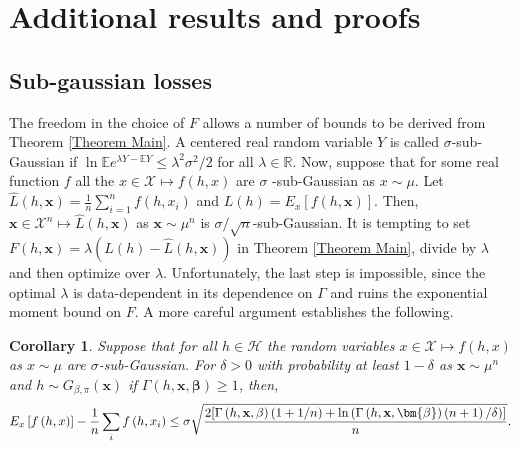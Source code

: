 \documentclass{article} %
\newtheorem{corollary}[theorem]{Corollary}
\begin{document}
\section{Additional results and proofs}

\subsection{Sub-gaussian losses\label{Section Subgaussian}}

The freedom in the choice of $F$ allows a number of bounds to be derived
from Theorem \ref{Theorem Main}. A centered real random variable $Y$ is called $\sigma $-sub-Gaussian
if $\ln \mathbb{E}e^{\lambda Y-\mathbb{E}Y}\leq \lambda ^{2}\sigma ^{2}/2$
for all $\lambda \in \mathbb{R}$. Now, suppose that for some real function $f$
all the $x\in \mathcal{X\mapsto }f\left( h,x\right) $ are $\sigma $%
-sub-Gaussian as $x\sim \mu $. Let  $\hat{L}(h, \mathbf{x}) = \frac{1}{n}\sum_{i=1}^{n} f(h, x_i)$ and $L(h) = E_x[f(h, \mathbf{x})]$. Then, $\mathbf{x}\in \mathcal{X}^{n}\mapsto 
\hat{L}\left( h,\mathbf{x}\right) $ as $\mathbf{x}\sim \mu ^{n}$ is $\sigma /%
\sqrt{n}$-sub-Gaussian. It is tempting to set $F\left( h,\mathbf{x}\right)
=\lambda \left( L\left( h\right) -\hat{L}\left( h,\mathbf{x}\right) \right) $
in Theorem \ref{Theorem Main}, divide by $\lambda $ and then optimize over $%
\lambda $. Unfortunately, the last step is impossible, since the optimal $%
\lambda $ is data-dependent in its dependence on $\Gamma $ and ruins the
exponential moment bound on $F$. A more careful argument establishes the
following.

\begin{corollary}
	\label{Corollary Stratify}Suppose that for all $h\in \mathcal{H}$ the random
	variables $x\in \mathcal{X\mapsto} f \left( h,x\right) $ as $x\sim \mu $
	are $\sigma $-sub-Gaussian. For $\delta >0$ with probability at least $%
	1-\delta $ as $\mathbf{x}\sim \mu ^{n}$ and $h\sim G_{\beta ,\pi }\left( 
	\mathbf{x}\right) $ if $\Gamma \left( h,\mathbf{x},\bm{\beta}\right)
	\geq 1$, then,%
	\begin{equation*}
		E_{x}\left[ f\left( h,x\right) \right] -\frac{1}{n}\sum_{i}f\left(
		h,x_{i}\right) \leq \sigma \sqrt{\frac{2[\Gamma \left( h,\mathbf{x},\mathbf{%
					\beta }\right) \left( 1+1/n\right) +\ln \left( \Gamma \left( h,\mathbf{x},%
				\bm{\beta}\right) \left( n+1\right) /\delta \right)]}{n}}.
	\end{equation*}
\end{corollary}
\end{document}
